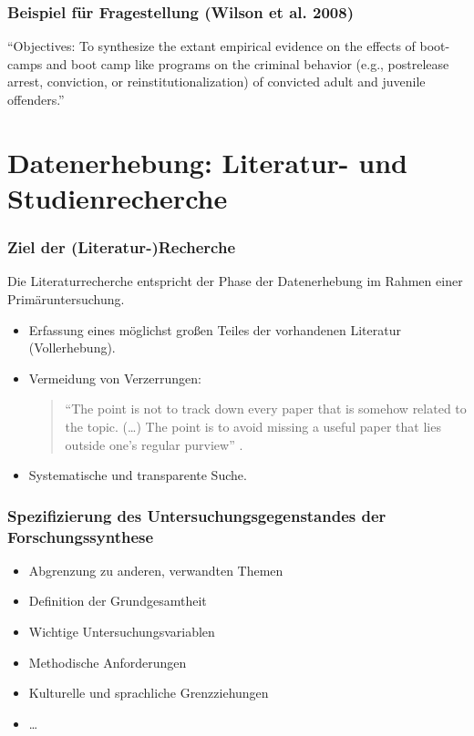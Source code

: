     \begin{frame}
      \frametitle{Beispiel für Fragestellung  (Wilson et al. 2008)}
      "`Objectives: To synthesize the extant empirical evidence on the effects of
      boot-camps and boot camp like programs on the criminal behavior (e.g., postrelease arrest, conviction, or
      reinstitutionalization) of convicted adult and juvenile offenders."'
    \end{frame}




\section{Datenerhebung: Literatur- und Studienrecherche}

\begin{frame}
  \frametitle{Ziel der (Literatur-)Recherche}
  Die Literaturrecherche entspricht der Phase der Datenerhebung im Rahmen einer Primäruntersuchung.
  \begin{itemize}[<+->]
  \item Erfassung eines möglichst großen Teiles der vorhandenen Literatur (Vollerhebung).
  \item Vermeidung von Verzerrungen:
    \begin{quotation}
      "`The point is not to track down every paper that is somehow related to
      the topic. (\ldots) The point is to avoid missing a useful paper that lies
      outside one's regular purview"' \citep[44]{white_scientific_1994}.
    \end{quotation}
  \item Systematische und transparente Suche.
  \end{itemize}
\end{frame}



\begin{frame}
  \frametitle{Spezifizierung des Untersuchungsgegenstandes der Forschungssynthese}
  \begin{itemize}[<+->]
  \item Abgrenzung zu anderen, verwandten Themen
  \item Definition der Grundgesamtheit
  \item Wichtige Untersuchungsvariablen
  \item Methodische Anforderungen
  \item Kulturelle und sprachliche Grenzziehungen
  \item \ldots
  \end{itemize}
\end{frame}



